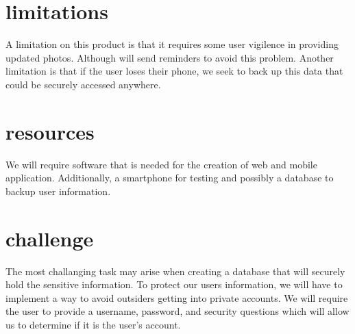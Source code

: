 \documentclass[12pt]{article}
\begin{document}
\section{limitations}
	A limitation on this product is that it requires some user vigilence in providing updated photos. Although will send reminders to avoid this problem. Another limitation is that if the user loses their phone, we seek to back up this data that could be securely accessed anywhere.

\section{resources}
	We will require software that is needed for the creation of web and mobile application. Additionally, a smartphone for testing and possibly a database to backup user information.

\section{challenge}
	The most challanging task may arise when creating a database that will securely hold the sensitive information. To protect our users information, we will have to implement a way to avoid outsiders getting into private accounts. We will require the user to provide a username, password, and security questions which will allow us to determine if it is the user's account.  


\cite{dailyNews}



\end{document}
